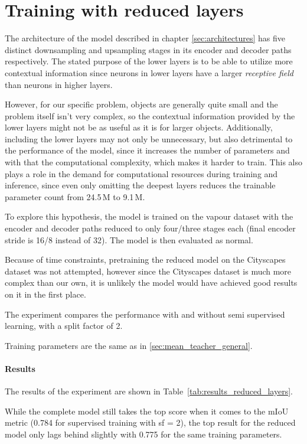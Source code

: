 \section{Training with reduced layers}
\label{sec:reduced_layers}

The architecture of the model described in chapter \ref{sec:architectures} has five distinct downsampling and upsampling stages in its encoder and decoder paths respectively.
The stated purpose of the lower layers is to be able to utilize more contextual information since neurons in lower layers have a larger \emph{receptive field} than neurons in higher layers.

However, for our specific problem, objects are generally quite small  and the problem itself isn't very complex, so the contextual information provided by the lower layers might not be as useful as it is for larger objects.
Additionally, including the lower layers may not only be unnecessary, but also detrimental to the performance of the model, since it increases the number of parameters and with that the computational complexity, which makes it harder to train. 
This also plays a role in the demand for computational resources during training and inference, since even only omitting the deepest layers reduces the trainable parameter count from 24.5\,M to 9.1\,M.

To explore this hypothesis, the model is trained on the vapour dataset with the encoder and decoder paths reduced to only four/three stages each (final encoder stride is 16/8 instead of 32). The model is then evaluated as normal.

Because of time constraints, pretraining the reduced model on the Cityscapes dataset was not attempted, however since the Cityscapes dataset is much more complex than our own, it is unlikely the model would have achieved good results on it in the first place.

The experiment compares the performance with and without semi supervised learning, with a split factor of 2.

Training parameters are the same as in \ref{sec:mean_teacher_general}.

\paragraph{Results}

The results of the experiment are shown in Table~\ref{tab:results_reduced_layers}.

While the complete model still takes the top score when it comes to the mIoU metric (0.784 for supervised training with sf = 2), the top result for the reduced model only lags behind slightly with 0.775 for the same training parameters.

